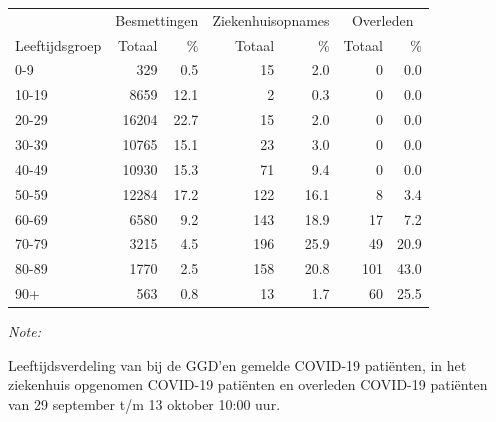 \documentclass[
  english,
  man,floatsintext]{apa6}
\begin{document}
\begin{table}[H]
\centering\begingroup\fontsize{11}{13}\selectfont

\begin{threeparttable}
\begin{tabular}{lrrrrrr}
\toprule
\multicolumn{1}{c}{ } & \multicolumn{2}{c}{Besmettingen} & \multicolumn{2}{c}{Ziekenhuisopnames} & \multicolumn{2}{c}{Overleden} \\
\cmidrule(l{3pt}r{3pt}){2-3} \cmidrule(l{3pt}r{3pt}){4-5} \cmidrule(l{3pt}r{3pt}){6-7}
Leeftijdsgroep & Totaal & \% & Totaal & \% & Totaal & \%\\
\midrule
0-9 & 329 & 0.5 & 15 & 2.0 & 0 & 0.0\\
10-19 & 8659 & 12.1 & 2 & 0.3 & 0 & 0.0\\
20-29 & 16204 & 22.7 & 15 & 2.0 & 0 & 0.0\\
30-39 & 10765 & 15.1 & 23 & 3.0 & 0 & 0.0\\
40-49 & 10930 & 15.3 & 71 & 9.4 & 0 & 0.0\\
50-59 & 12284 & 17.2 & 122 & 16.1 & 8 & 3.4\\
60-69 & 6580 & 9.2 & 143 & 18.9 & 17 & 7.2\\
70-79 & 3215 & 4.5 & 196 & 25.9 & 49 & 20.9\\
80-89 & 1770 & 2.5 & 158 & 20.8 & 101 & 43.0\\
90+ & 563 & 0.8 & 13 & 1.7 & 60 & 25.5\\
\bottomrule
\end{tabular}
\begin{tablenotes}
\item \textit{Note: } 
\item Leeftijdsverdeling van bij de GGD’en gemelde COVID-19 patiënten, in het ziekenhuis opgenomen COVID-19 patiënten en overleden COVID-19 patiënten van 29 september t/m 13 oktober 10:00 uur.
\end{tablenotes}
\end{threeparttable}
\endgroup{}
\end{table}
\end{document}
